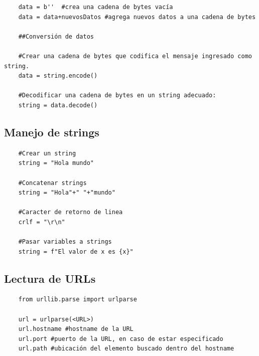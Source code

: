 \documentclass[a4paper,10pt]{article}
\begin{document}
\begin{verbatim}
    data = b''  #crea una cadena de bytes vacía
    data = data+nuevosDatos #agrega nuevos datos a una cadena de bytes

    ##Conversión de datos

    #Crear una cadena de bytes que codifica el mensaje ingresado como string.
    data = string.encode()
    
    #Decodificar una cadena de bytes en un string adecuado:
    string = data.decode()
\end{verbatim}

\subsection*{Manejo de strings}

\begin{verbatim}
    #Crear un string
    string = "Hola mundo"
    
    #Concatenar strings
    string = "Hola"+" "+"mundo"

    #Caracter de retorno de linea
    crlf = "\r\n"

    #Pasar variables a strings
    string = f"El valor de x es {x}"
\end{verbatim}


\subsection*{Lectura de URLs}

\begin{verbatim}
    from urllib.parse import urlparse

    url = urlparse(<URL>)
    url.hostname #hostname de la URL
    url.port #puerto de la URL, en caso de estar especificado
    url.path #ubicación del elemento buscado dentro del hostname
\end{verbatim}
\end{document}
